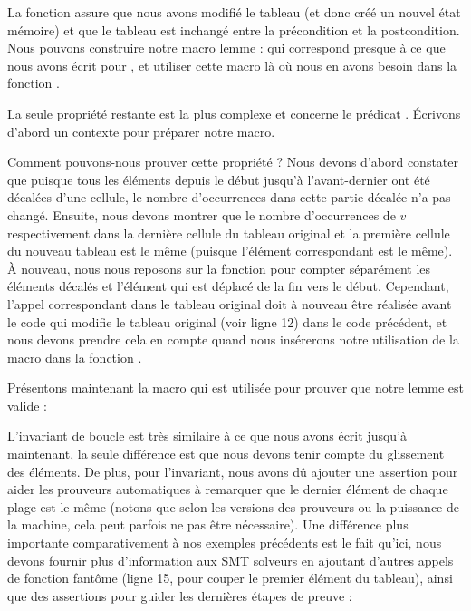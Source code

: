 

La fonction  assure que nous avons
modifié le tableau (et donc créé un nouvel état mémoire) et que le tableau est
inchangé entre la précondition et la postcondition. Nous pouvons construire
notre macro lemme :
qui correspond presque à ce que nous avons écrit pour ,
et utiliser cette macro là où nous en avons besoin dans la fonction
.




La seule propriété restante est la plus complexe et concerne le prédicat
. Écrivons d'abord un contexte pour préparer notre
macro.




Comment pouvons-nous prouver cette propriété ? Nous devons d'abord constater
que puisque tous les éléments depuis le début jusqu'à l'avant-dernier ont été
décalées d'une cellule, le nombre d'occurrences dans cette partie décalée n'a
pas changé. Ensuite, nous devons montrer que le nombre d'occurrences de $v$
respectivement dans la dernière cellule du tableau original et la première
cellule du nouveau tableau est le même (puisque l'élément correspondant est le
même). À nouveau, nous nous reposons sur la fonction  pour compter
séparément les éléments décalés et l'élément qui est déplacé de la fin vers le
début. Cependant, l'appel correspondant dans le tableau original doit à nouveau
être réalisée avant le code qui modifie le tableau original (voir ligne 12) dans
le code précédent, et nous devons prendre cela en compte quand nous insérerons
notre utilisation de la macro dans la fonction .


Présentons maintenant la macro qui est utilisée pour prouver que notre lemme
est valide :




L'invariant de boucle est très similaire à ce que nous avons écrit jusqu'à
maintenant, la seule différence est que nous devons tenir compte du glissement
des éléments. De plus, pour l'invariant, nous avons dû ajouter une assertion
pour aider les prouveurs automatiques à remarquer que le dernier élément de
chaque plage est le même (notons que selon les versions des prouveurs ou la
puissance de la machine, cela peut parfois ne pas être nécessaire). Une différence
plus importante comparativement à nos exemples précédents est le fait qu'ici, nous
devons fournir plus d'information aux SMT solveurs en ajoutant d'autres appels
de fonction fantôme (ligne 15, pour couper le premier élément du tableau), ainsi
que des assertions pour guider les dernières étapes de preuve :


